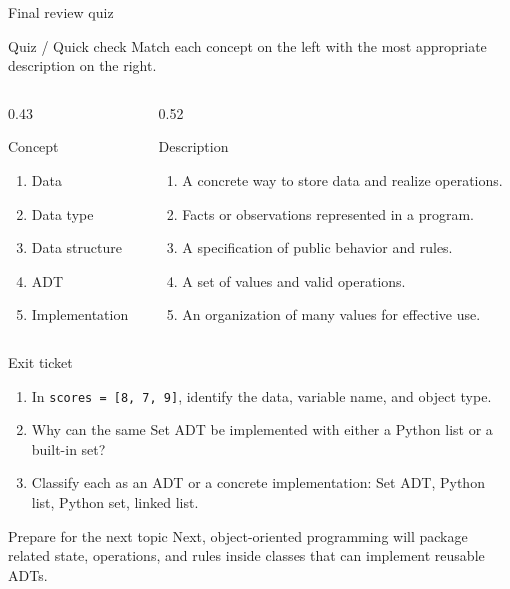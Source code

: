 \documentclass[aspectratio=169]{beamer}
\newcommand{\quizblock}[1]{%
  \begin{alertblock}{Quiz / Quick check}
    #1
  \end{alertblock}
}
\begin{document}
\begin{frame}{Final review quiz}
\footnotesize
\quizblock{Match each concept on the left with the most appropriate description on the right.}
\vspace{0.3em}
\begin{columns}[T]
\begin{column}{0.43\textwidth}
\begin{block}{Concept}
\begin{enumerate}
  \item Data
  \item Data type
  \item Data structure
  \item ADT
  \item Implementation
\end{enumerate}
\end{block}
\end{column}
\begin{column}{0.52\textwidth}
\begin{exampleblock}{Description}
\begin{enumerate}
  \item[A.] A concrete way to store data and realize operations.
  \item[B.] Facts or observations represented in a program.
  \item[C.] A specification of public behavior and rules.
  \item[D.] A set of values and valid operations.
  \item[E.] An organization of many values for effective use.
\end{enumerate}
\end{exampleblock}
\end{column}
\end{columns}
\end{frame}

\begin{frame}{Exit ticket}
  \begin{enumerate}
    \item In \texttt{scores = [8, 7, 9]}, identify the data, variable name, and object type.
    \item Why can the same Set ADT be implemented with either a Python list or a built-in set?
    \item Classify each as an ADT or a concrete implementation: Set ADT, Python list, Python set, linked list.
  \end{enumerate}

  \vspace{0.7em}
  \begin{exampleblock}{Prepare for the next topic}
    Next, object-oriented programming will package related state, operations,
    and rules inside classes that can implement reusable ADTs.
  \end{exampleblock}
\end{frame}
\end{document}
